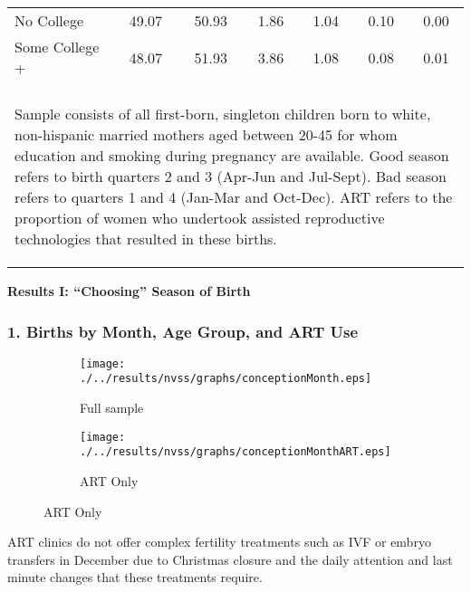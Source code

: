 \documentclass[10pt,letterpaper,subeqn]{beamer}
\begin{document}
\begin{frame}
\begin{table}[htpb!]
\begin{center}
{\begin{tabular}{lcccccc}
No College&49.07&50.93&1.86&1.04&0.10&0.00
\\
Some College +&48.07&51.93&3.86&1.08&0.08&0.01
\\
 &&&&&& \\
\midrule\multicolumn{7}{p{11.4cm}}{\begin{footnotesize}Sample consists of all first-born, singleton children born to white, non-hispanic married mothers aged between 20-45 for whom     education and smoking during pregnancy are available. Good season refers to birth quarters 2 and 3 (Apr-Jun and Jul-Sept).  Bad season refers to quarters 1 and 4 (Jan-Mar and Oct-Dec). ART refers to the proportion of  women who undertook assisted reproductive technologies that resulted in these births.
\end{footnotesize}} \\ \bottomrule
 \end{tabular}}\end{center}\end{table}
\end{frame}

\begin{frame}
  \begin{center}
    \textbf{Results I: ``Choosing'' Season of Birth}
  \end{center}
\end{frame}


\begin{frame}
\frametitle{1. Births by Month, Age Group, and ART Use}
\begin{figure}[htpb!]
\begin{center}
\caption{Birth Prevalence by Month, Age Group, and ART Usage}
\label{bqFig:concepMonth}
\begin{subfigure}{.5\textwidth}
  \centering
  \texttt{[image: ./../results/nvss/graphs/conceptionMonth.eps]}
  \caption{Full sample}
  \label{fig:concepAbs}
\end{subfigure}%
\begin{subfigure}{.5\textwidth}
  \centering
  \texttt{[image: ./../results/nvss/graphs/conceptionMonthART.eps]}
  \caption{ART Only}
  \label{fig:concepAbsART}
\end{subfigure}
\end{center}
\end{figure}
ART clinics do not offer complex fertility treatments such as IVF or embryo transfers in December due to Christmas closure and the daily attention and last minute changes that these treatments require.
\end{frame}
\end{document}
